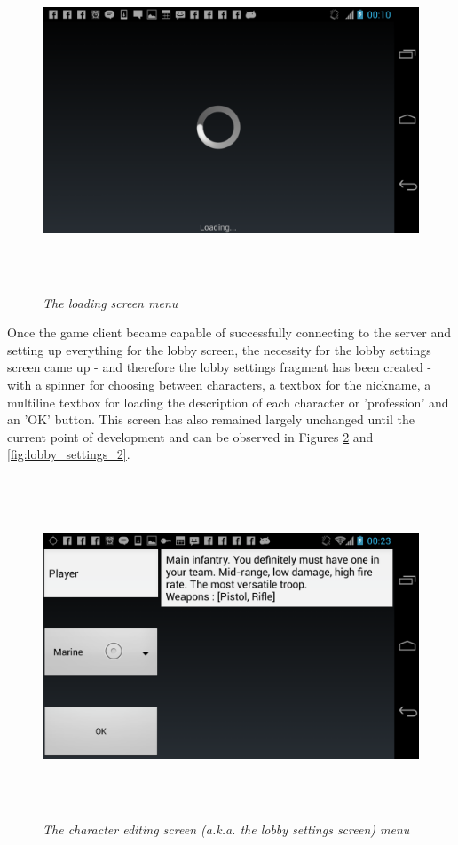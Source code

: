 \documentclass{article}
\begin{document}
\begin{figure}
\includegraphics[height=4in,width=7.12in]{./images/android_screenshots/tutorial_loading.png}
\caption{\small \sl The loading screen
menu\label{fig:loading}}
\end{figure}

Once the game client became capable of successfully connecting to the server and
setting up everything for the lobby screen, the necessity for the lobby settings
screen came up - and therefore the lobby settings fragment has been created -
with a spinner for choosing between characters, a textbox for the nickname, a
multiline textbox for loading the description of each character or 'profession'
and an 'OK' button. This screen has also remained largely unchanged until the
current point of development and can be observed in Figures
\ref{fig:lobby_settings_1} and \ref{fig:lobby_settings_2}.

\begin{figure}
\includegraphics[height=4in,width=7.12in]{./images/android_screenshots/first_development/game_first_development_9.png}
\caption{\small \sl The character editing screen (a.k.a. the lobby settings
screen) menu\label{fig:lobby_settings_1}}
\end{figure}
\end{document}
